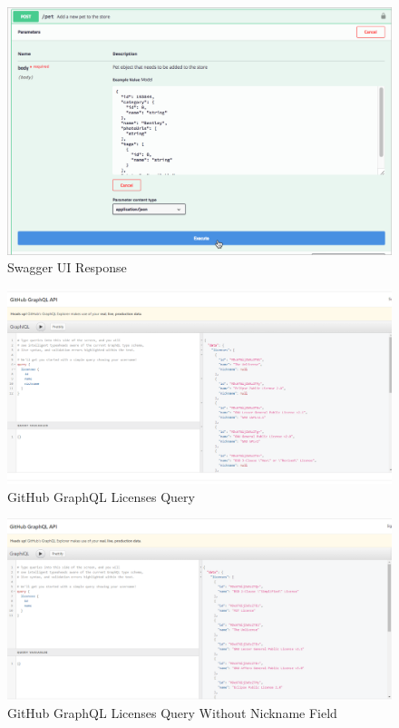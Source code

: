 \begin{figure}[!ht]
  \centering\includegraphics[width=\columnwidth]{images/swaggerui_execute.png}
  \caption{Swagger UI Response}\label{f:swagger-resp}
\end{figure}

\begin{figure}[!ht]
  \centering\includegraphics[width=\columnwidth]{images/github-graphql-1.png}
  \caption{GitHub GraphQL Licenses Query}\label{f:github-graphql-1}
\end{figure}

\begin{figure}[!ht]
  \centering\includegraphics[width=\columnwidth]{images/github-graphql-2.png}
  \caption{GitHub GraphQL Licenses Query Without Nickname Field}\label{f:github-graphql-2}
\end{figure}

